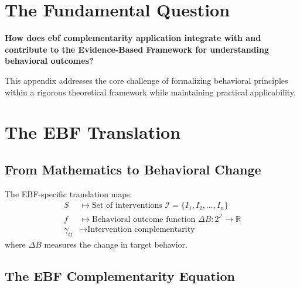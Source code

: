 \section{The Fundamental Question}
\label{sec:ebf-fundamental}

\begin{tcolorbox}[
    colback=red!5!white,
    colframe=red!75!black,
    title={\textbf{Fundamental Question}}
]
\textbf{How does ebf complementarity application integrate with and contribute to the
Evidence-Based Framework for understanding behavioral outcomes?}

This appendix addresses the core challenge of formalizing behavioral principles
within a rigorous theoretical framework while maintaining practical applicability.
\end{tcolorbox}


\section{The EBF Translation}
\label{sec:ebf-translation}

\subsection{From Mathematics to Behavioral Change}

\begin{definition}
The EBF-specific translation maps:
\begin{align}
S &\mapsto \text{Set of interventions } \mathcal{I} = \{I_1, I_2, \ldots, I_n\} \\
f &\mapsto \text{Behavioral outcome function } \Delta B: 2^\mathcal{I} \to \mathbb{R} \\
\gamma_{ij} &\mapsto \text{Intervention complementarity}
\end{align}
where $\Delta B$ measures the change in target behavior.
\end{definition}

\subsection{The EBF Complementarity Equation}

